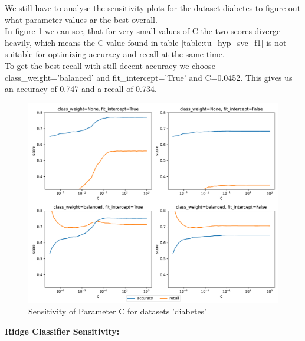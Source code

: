 \documentclass[a4paper,10pt]{article}
\begin{document}
We still have to analyse the sensitivity plots for the dataset diabetes to figure out what parameter values ar the best overall.\\
In figure \ref{fig:sensitivity svc diabetes} we can see, that for very small values of \textsf{C} the two scores diverge heavily, which means the \textsf{C} value found in table \ref{table:tu_hyp_svc_f1} is not suitable for optimizing accuracy and recall at the same time.\\
To get the best recall with still decent accuracy we choose \textsf{class\_weight}=\textsf{'balanced'} and \textsf{fit\_intercept}='True' and \textsf{C}=0.0452. This gives us an accuracy of 0.747 and a recall of 0.734.%

\begin{figure}[h!]
    \centering
    \includegraphics[width=\textwidth]{diabetes/plots/linearsvc_parameter_sensitivity.pdf}
    \caption{Sensitivity of Parameter \textsf{C} for datasets 'diabetes'}
    \label{fig:sensitivity svc diabetes}
\end{figure}

\textbf{Ridge Classifier Sensitivity:}
\end{document}
